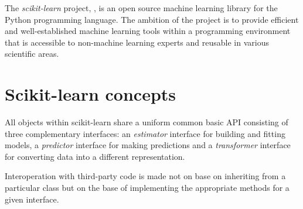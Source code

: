 \documentclass{frontiersSCNS} %
\begin{document}
The {\em scikit-learn} project, \cite{pedregosa2011}, is an open source machine
learning library for the Python programming language. The ambition of the
project is to provide efficient and well-established machine learning tools within
a programming environment that is accessible to non-machine learning experts
and reusable in various scientific areas.




\section{Scikit-learn concepts}


All objects within scikit-learn share a uniform common basic API consisting of three
complementary interfaces: an \textit{estimator} interface for building and
fitting models, a \textit{predictor} interface for making predictions and a
\textit{transformer} interface for converting data into a different representation.

Interoperation with third-party code is made not on base on inheriting from a
particular class but on the base of implementing the appropriate methods for a
given interface.
\end{document}
